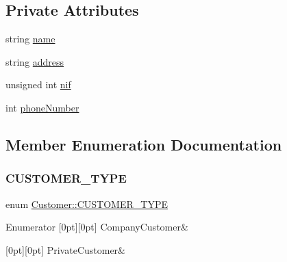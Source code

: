 \subsection*{Private Attributes}
\begin{DoxyCompactItemize}
\item 
string \hyperlink{classCustomer_a42c1c948fa0121c82b2725826d9f8300}{name}
\item 
string \hyperlink{classCustomer_a72d87951c1b76883390d00baf044cf2c}{address}
\item 
unsigned int \hyperlink{classCustomer_a65ad3329532d5ad31e36f4ac81858e31}{nif}
\item 
int \hyperlink{classCustomer_ad8c8d99b4c35f66a1a87b234c6078e0f}{phone\+Number}
\end{DoxyCompactItemize}


\subsection{Member Enumeration Documentation}
\hypertarget{classCustomer_adf157cb713398bb38163743659ec3049}{}\label{classCustomer_adf157cb713398bb38163743659ec3049} 
\subsubsection{\texorpdfstring{C\+U\+S\+T\+O\+M\+E\+R\+\_\+\+T\+Y\+PE}{CUSTOMER\_TYPE}}
{\footnotesize\ttfamily enum \hyperlink{classCustomer_adf157cb713398bb38163743659ec3049}{Customer\+::\+C\+U\+S\+T\+O\+M\+E\+R\+\_\+\+T\+Y\+PE}}

\begin{DoxyEnumFields}{Enumerator}
[0pt][0pt]{}\hypertarget{classCustomer_adf157cb713398bb38163743659ec3049a6fd178caeb0cc24f8f4689d2d86de82b}{}\label{classCustomer_adf157cb713398bb38163743659ec3049a6fd178caeb0cc24f8f4689d2d86de82b} 
Company\+Customer&\\
\hline

[0pt][0pt]{}\hypertarget{classCustomer_adf157cb713398bb38163743659ec3049a74cbae8b7e90efe986479e433ab9a840}{}\label{classCustomer_adf157cb713398bb38163743659ec3049a74cbae8b7e90efe986479e433ab9a840} 
Private\+Customer&\\
\hline

\end{DoxyEnumFields}


